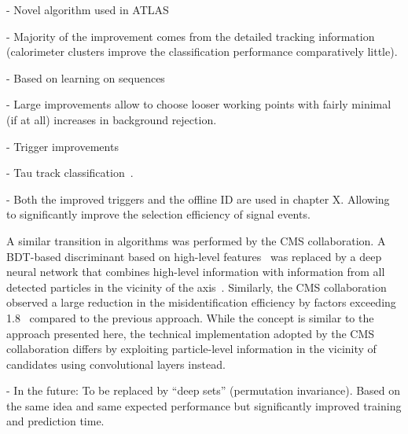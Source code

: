 - Novel \tauid algorithm used in ATLAS

- Majority of the improvement comes from the detailed tracking
information (calorimeter clusters improve the classification
performance comparatively little).

- Based on learning on sequences

- Large improvements allow to choose looser working points with fairly
minimal (if at all) increases in background rejection.

- Trigger improvements \cite{ATL-DAQ-PUB-2019-001}

- Tau track classification~\cite{Maerker:2021hro}.

- Both the improved triggers and the offline ID are used in chapter
X. Allowing to significantly improve the selection efficiency of
signal events.


A similar transition in \tauid algorithms was performed by the CMS
collaboration. A BDT-based discriminant based on high-level
features~\cite{CMS-TAU-16-003} was replaced by a deep neural network
that combines high-level information with information from all
detected particles in the vicinity of the \tauhadvis
axis~\cite{CMS-TAU-20-001}. Similarly, the CMS collaboration observed
a large reduction in the \faketauhadvis misidentification efficiency
by factors exceeding 1.8~\cite{CMS-TAU-20-001} compared to the
previous approach.  While the concept is similar to the approach
presented here, the technical implementation adopted by the CMS
collaboration differs by exploiting particle-level information in the
vicinity of \tauhadvis candidates using convolutional layers instead.

- In the future: To be replaced by ``deep sets'' (permutation
invariance). Based on the same idea and same expected performance but
significantly improved training and prediction time.

\cite{NIPS2017_f22e4747}


